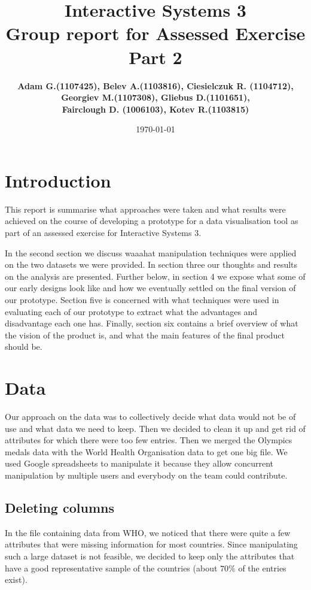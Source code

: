 \documentclass[a4paper]{article}
\title{Interactive Systems 3\\ \vspace{4mm} 
Group report for Assessed Exercise Part 2}
\author{\bf Adam G.(1107425), Belev A.(1103816), Ciesielczuk R. (1104712),\\ \bf Georgiev M.(1107308), Gliebus D.(1101651),\\ \bf Fairclough D. (1006103), Kotev R.(1103815)}
\date{\today}
\begin{document}
\maketitle

\section{Introduction}

This report is summarise what approaches were taken and what results were achieved on the course of developing a prototype for a data visualisation tool as part of an assessed exercise for Interactive Systems 3.

In the second section we discuss waaahat manipulation techniques were applied on the two datasets we were provided. In section three our thoughts and results on the analysis are presented. Further below, in section 4 we expose what some of our early designs look like and how we eventually settled on the final version of our prototype. Section five is concerned with what techniques were used in evaluating each of our prototype to extract what the advantages and disadvantage each one has. Finally, section six contains a brief overview of what the vision of the product is, and what the main features of the final product should be.


\section{Data}

Our approach on the data was to collectively decide what data would not be of use and what data we need to keep. Then we decided to clean it up and get rid of attributes for which there were too few entries. Then we merged the Olympics medals data with the World Health Organisation data to get one big file.
We used Google spreadsheets to manipulate it because they allow concurrent manipulation by multiple users and everybody on the team could contribute.

\subsection{Deleting columns}

In the file containing data from WHO, we noticed that there were quite a few attributes that were missing information for most countries. Since manipulating such a large dataset is not feasible, we decided to keep only the attributes that have a good representative sample of the countries (about $70\%$ of the entries exist).
\end{document}
